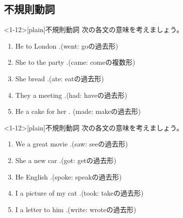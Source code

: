 \documentclass[aspectratio=169,xcolor={dvipsnames,table}]{beamer}
\newcommand{\myaudio}[1]{\href{#1}{\faVolumeUp}}
\begin{document}
\subsection{不規則動詞}
\begin{frame}<1-12>[plain]{不規則動詞}
 次の各文の意味を考えましょう。

 \begin{enumerate}
  \item He  to London .\hfill{}{\small (went: goの過去形)}
  \item She  to the party .\hfill{}{\small (came: comeの複数形)}
  \item She  bread .\hfill{}{\small (ate: eatの過去形)}
  \item They  a meeting .\hfill{}{\small (had: haveの過去形)}
  \item He  a cake for her . \hfill{}{\small (made: makeの過去形)}
\end{enumerate}
\hfill\myaudio{./audio/025_past_do_11.mp3}

\end{frame}


\begin{frame}<1-12>[plain]{不規則動詞}
 次の各文の意味を考えましょう。

 \begin{enumerate}%
   \item We   a great movie  .\hfill{}{\small (saw: seeの過去形)}
  \item She  a new car  .\hfill{}{\small (got: getの過去形)}
  \item He  English  .\hfill{}{\small (spoke: speakの過去形)}
  \item I  a picture of my cat  .\hfill{}{\small (took: takeの過去形)}
  \item I  a letter to him  .\hfill{}{\small (write: wroteの過去形)}
\end{enumerate}
\hfill\myaudio{./audio/025_past_do_12.mp3}

\end{frame}
\end{document}
